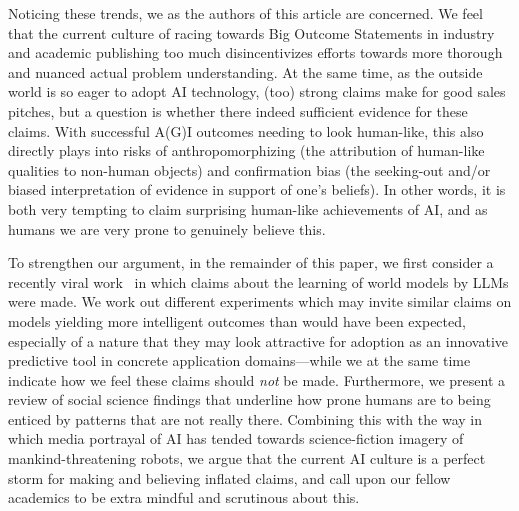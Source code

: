 \documentclass{article}
\theoremstyle{plain}
\theoremstyle{definition}
\theoremstyle{remark}
\begin{document}
Noticing these trends, we as the authors of this article are concerned. We feel that the current culture of racing towards Big Outcome Statements in industry and academic publishing too much disincentivizes efforts towards more thorough and nuanced actual problem understanding. At the same time, as the outside world is so eager to adopt AI technology, (too) strong claims make for good sales pitches, but a question is whether there indeed sufficient evidence for these claims. With successful A(G)I outcomes needing to look human-like, this also directly plays into risks of anthropomorphizing (the attribution of human-like qualities to non-human objects) and confirmation bias (the seeking-out and/or biased interpretation of evidence in support of one's beliefs). In other words, it is both very tempting to claim surprising human-like achievements of AI, and as humans we are very prone to genuinely believe this.

To strengthen our argument, in the remainder of this paper, we first consider a recently viral work~\cite{gurnee2023languagev2} in which claims about the learning of world models by LLMs were made. We work out different experiments which may invite similar claims on models yielding more intelligent outcomes than would have been expected, especially of a nature that they may look attractive for adoption as an innovative predictive tool in concrete application domains---while we at the same time indicate how we feel these claims should \emph{not} be made. Furthermore, we present a review of social science findings that underline how prone humans are to being enticed by patterns that are not really there. Combining this with the way in which media portrayal of AI has tended towards science-fiction imagery of mankind-threatening robots, we argue that the current AI culture is a perfect storm for making and believing inflated claims, and call upon our fellow academics to be extra mindful and scrutinous about this.

\end{document}
